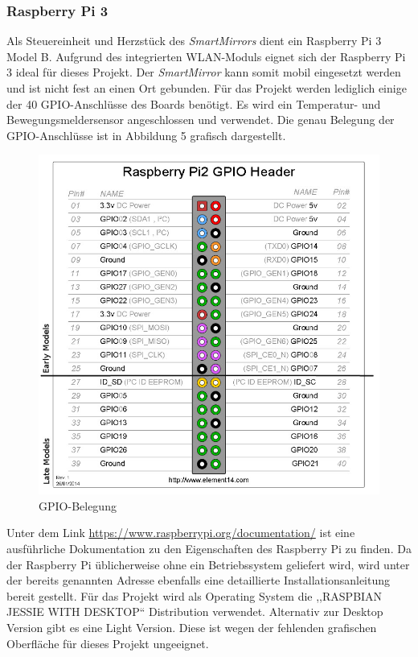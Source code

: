 \subsubsection{Raspberry Pi 3}
Als Steuereinheit und Herzstück des \textit{SmartMirrors} dient ein Raspberry Pi 3 Model B. Aufgrund des integrierten WLAN-Moduls eignet sich der Raspberry Pi 3 ideal für dieses Projekt. Der \textit{SmartMirror} kann somit mobil eingesetzt werden und ist nicht fest an einen Ort gebunden. 
Für das Projekt werden lediglich einige der 40 GPIO-Anschlüsse des Boards benötigt. Es wird ein Temperatur- und Bewegungsmeldersensor angeschlossen und verwendet. Die genau Belegung der GPIO-Anschlüsse ist in Abbildung 5 grafisch dargestellt.
\begin{figure}[H]
	\includegraphics[scale=0.4]{bilder/gpio_pinout.jpg}
	\caption{GPIO-Belegung}
\end{figure}
Unter dem Link \url{https://www.raspberrypi.org/documentation/} ist eine ausführliche Dokumentation zu den Eigenschaften des Raspberry Pi zu finden. Da der Raspberry Pi üblicherweise ohne ein Betriebssystem geliefert wird, wird unter der bereits genannten Adresse ebenfalls eine detaillierte Installationsanleitung bereit gestellt. Für das Projekt wird als Operating System die ,,RASPBIAN JESSIE WITH DESKTOP`` Distribution verwendet. Alternativ zur Desktop Version gibt es eine Light Version. Diese ist wegen der fehlenden grafischen Oberfläche für dieses Projekt ungeeignet.

